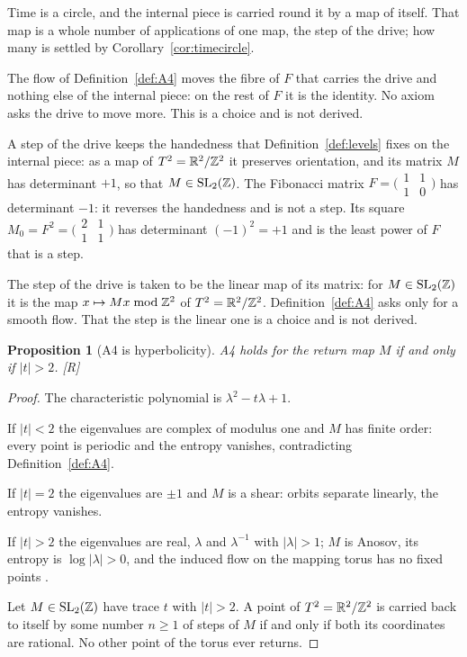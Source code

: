 \documentclass[11pt,a4paper]{article}
\theoremstyle{plain}
\newtheorem{proposition}[theorem]{Proposition}
\theoremstyle{definition}
\theoremstyle{remark}
\newcommand{\rigR}{[\textup{R}]}
\begin{document}
Time is a circle, and the internal piece is carried round it by a map of itself. That map is a whole number of applications of one map, the step of the drive; how many is settled by Corollary~\ref{cor:timecircle}.

The flow of Definition~\ref{def:A4} moves the fibre of $F$ that carries the drive and nothing else of the internal piece: on the rest of $F$ it is the identity. No axiom asks the drive to move more. This is a choice and is not derived.

A step of the drive keeps the handedness that Definition~\ref{def:levels} fixes on the internal piece: as a map of $T^2=\mathbb{R}^{2}/\mathbb{Z}^{2}$ it preserves orientation, and its matrix $M$ has determinant $+1$, so that $M\in\mathrm{SL}_{2}(\mathbb{Z})$. The Fibonacci matrix $F=\bigl(\begin{smallmatrix}1&1\\1&0\end{smallmatrix}\bigr)$ has determinant $-1$: it reverses the handedness and is not a step. Its square $M_{0}=F^{2}=\bigl(\begin{smallmatrix}2&1\\1&1\end{smallmatrix}\bigr)$ has determinant $(-1)^{2}=+1$ and is the least power of $F$ that is a step.

The step of the drive is taken to be the linear map of its matrix: for $M\in\mathrm{SL}_{2}(\mathbb{Z})$ it is the map $x\mapsto Mx \bmod \mathbb{Z}^{2}$ of $T^2=\mathbb{R}^{2}/\mathbb{Z}^{2}$. Definition~\ref{def:A4} asks only for a smooth flow. That the step is the linear one is a choice and is not derived.

\begin{proposition}[A4 is hyperbolicity]\label{prop:hyp}
A4 holds for the return map $M$ if and only if $\lvert t\rvert>2$. \rigR
\end{proposition}

\begin{proof}
The characteristic polynomial is $\lambda^{2}-t\lambda+1$.

If $\lvert t\rvert<2$ the eigenvalues are complex of modulus one and $M$ has finite order: every point is periodic and the entropy vanishes, contradicting Definition~\ref{def:A4}.

If $\lvert t\rvert=2$ the eigenvalues are $\pm1$ and $M$ is a shear: orbits separate linearly, the entropy vanishes.

If $\lvert t\rvert>2$ the eigenvalues are real, $\lambda$ and $\lambda^{-1}$ with $\lvert\lambda\rvert>1$; $M$ is Anosov, its entropy is $\log\lvert\lambda\rvert>0$, and the induced flow on the mapping torus has no fixed points \cite{KatokHasselblatt}.

Let $M\in\mathrm{SL}_{2}(\mathbb{Z})$ have trace $t$ with $\lvert t\rvert>2$. A point of $T^2=\mathbb{R}^{2}/\mathbb{Z}^{2}$ is carried back to itself by some number $n\ge1$ of steps of $M$ if and only if both its coordinates are rational. No other point of the torus ever returns.
\end{proof}
\end{document}
